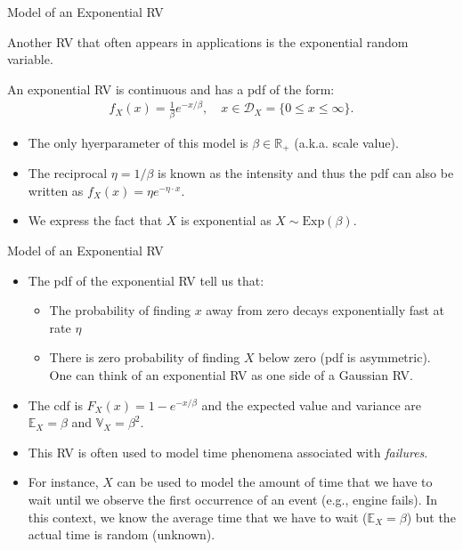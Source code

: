 \documentclass[9pt]{beamer}
\begin{document}
%
\begin{frame}{Model of an Exponential RV}

Another RV that often appears in applications is the exponential random variable.  

\begin{block}{}
An exponential RV is continuous and has a pdf of the form:
\begin{align*}
f_X(x)=\frac{1}{\beta}e^{-x/\beta},\quad x\in \mathcal{D}_X=\{0\leq x\leq \infty\}.
\end{align*}
\end{block}
\begin{itemize}
\item The only hyerparameter of this model is $\beta \in \mathbb{R}_+$ (a.k.a. scale value). 
\item The reciprocal $\eta=1/\beta$ is known as the intensity and thus the pdf can also be written as $f_X(x)=\eta e^{-\eta\cdot x}$. 
\item We express the fact that $X$ is exponential as $X\sim \textrm{Exp}(\beta)$.
\end{itemize}

\end{frame}

%
\begin{frame}{Model of an Exponential RV}

\begin{itemize}
\item The pdf of the exponential RV tell us that:
\begin{itemize} 
\item The probability of finding $x$ away from zero decays exponentially fast at rate $\eta$
\item There is zero probability of finding $X$ below zero (pdf is asymmetric). One can think of an exponential RV as one side of a Gaussian RV. 
\end{itemize}
\item The cdf is $F_X(x)=1-e^{-x/\beta}$ and the expected value and variance are $\mathbb{E}_X=\beta$ and $\mathbb{V}_X=\beta^2$.
\item This RV is often used to model time phenomena associated with {\em failures}. 
\item For instance, $X$ can be used to model the amount of time that we have to wait until we observe the first occurrence of an event (e.g., engine fails). In this context, we know the average time that we have to wait ($\mathbb{E}_X=\beta$) but the actual time is random (unknown). 
\end{itemize}

\end{frame}
\end{document}
